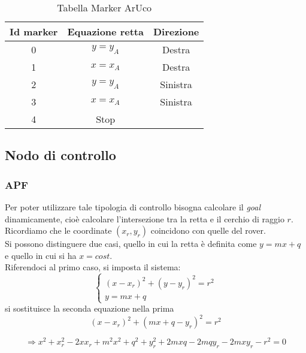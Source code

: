   \begin{table} [H]
    \centering
    \begin{tabular}{|ccc|}
    \hline
        Id marker & Equazione retta & Direzione \\  \hline
        0 &  $ y = y_A$  & Destra   \\  \hline
        1 &  $ x= x_A $  & Destra\\  \hline
        2 &  $ y = y_A $ & Sinistra\\  \hline
        3 &  $ x = x_A $ & Sinistra\\  \hline
        4 &   Stop  & \\ \hline
    \end{tabular}
     \caption{Tabella Marker ArUco}
    \label{tab:ArUco}    
\end{table}


  
\subsection{Nodo di controllo}
\subsubsection{APF}
Per poter utilizzare tale tipologia di controllo bisogna calcolare il \textit{goal} dinamicamente, cioè calcolare l'intersezione tra la retta e il cerchio di raggio $r$. Ricordiamo che le coordinate $(x_r,y_r)$ coincidono con quelle del rover. \\
Si possono distinguere due casi, quello in cui la retta è definita come $y=mx+q$ e quello in cui si ha $x=cost$.\\
Riferendoci al primo caso, si imposta il sistema:
\begin{equation} 
\begin{cases}

    (x-x_r)^2+(y-y_r)^2=r^2
   \\
    y=mx+q 
  \end{cases} 
\end{equation}
si sostituisce la seconda equazione nella prima
\begin{equation*}
(x-x_r)^2+(mx+q-y_r)^2=r^2
\end{equation*}

\begin{equation}
\Rightarrow x^2+x_r^2-2xx_r+m^2x^2+q^2+y_r^2+2mxq-2mqy_r-2mxy_r-r^2=0
\end{equation}

